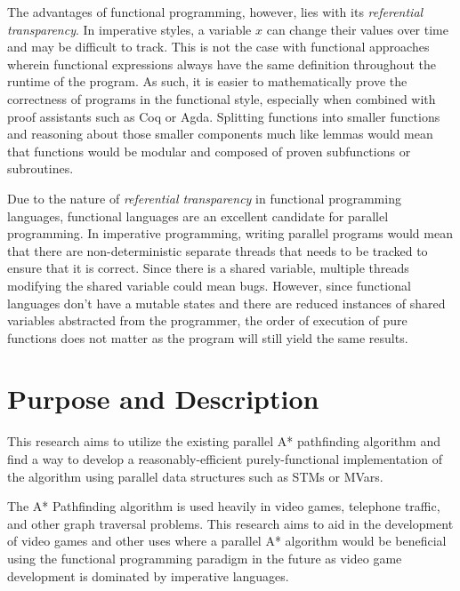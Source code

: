 The advantages of functional programming, however, lies with its \emph{referential transparency}.
In imperative styles, a variable $x$ can change their values over time and may be difficult to track.
This is not the case with functional approaches wherein functional expressions always have the same 
definition throughout the runtime of the program.\cite{Kesseler1996,Hammond2011} 
As such, it is easier to mathematically prove the correctness 
of programs in the functional style, especially when combined with proof assistants such as Coq
or Agda.\cite{Breitner2018,SpectorZabusky2018,ElBakouny2017} Splitting functions into smaller functions and reasoning 
about those smaller components much like lemmas would mean that functions would be modular and composed of proven
subfunctions or subroutines.\cite{AbelBenkeBove2005,Hughes1989} 

Due to the nature of \emph{referential transparency} in functional programming languages,
functional languages are an excellent candidate for parallel programming. In imperative programming,
writing parallel programs would mean that there are non-deterministic separate threads that needs to be 
tracked to ensure that it is correct. Since there is a shared variable, multiple threads modifying the shared 
variable could mean bugs. However, since functional languages don't have a mutable states and there are reduced
instances of shared variables abstracted from the programmer, the order of execution of pure functions does not 
matter as the program will still yield the same results.\cite{Kesseler1996}

\section{Purpose and Description}

This research aims to utilize the existing parallel A* pathfinding algorithm
\cite{ZaghloulAlJami2017,WeinstockHolladay}
and find a way to develop a reasonably-efficient purely-functional 
implementation of the algorithm using parallel data structures such 
as STMs or MVars\cite{Marlow2013}.  

The A* Pathfinding algorithm is used heavily in video games, telephone traffic, 
and other graph traversal problems\cite{HartNilssonRaphael1968}. This research 
aims to aid in the development of video games and other uses where a parallel 
A* algorithm would be beneficial using the functional 
programming paradigm in the future as video game development is dominated 
by imperative languages.

